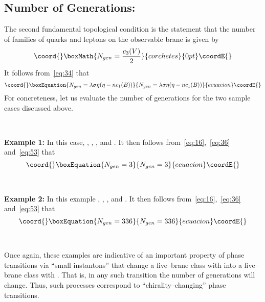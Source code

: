 \documentclass[a4paper,12pt]{article}
\numberwithin{equation}{section}
\def\cE{{\mathcal E}}
\def\cS{{\mathcal S}}
\theoremstyle{plain}
\begin{document}
\subsection*{Number of Generations:}

The second fundamental topological condition is the statement that the number
of families of quarks and leptons on the observable brane is given by
\[\coord{}\boxMath{
N_{gen}=\frac{c_{3}(V)}{2}
}{corchetes}{0pt}\coordE{}\]
It follows from~\eqref{eq:34} that
\begin{equation}\coord{}\boxEquation{
N_{gen}=\lambda \sigma \eta( \eta-nc_{1}(B))
\label{eq:53}
}{
N_{gen}=\lambda \sigma \eta( \eta-nc_{1}(B))
}{ecuacion}\coordE{}\end{equation}
For concreteness, let us evaluate the number of generations for the two 
sample cases discussed above.


\smallskip

\

\noindent
{\bf Example 1:} \quad 
In this case, \coordHE{}, \coordHE{}, \coordHE{}, \myHighlight{$\eta=12\cS+15\cE$}\coordHE{} and
\coordHE{}. It then follows
from~\eqref{eq:16},~\eqref{eq:36} and~\eqref{eq:53} that 
\begin{equation}\coord{}\boxEquation{
N_{gen}=3
\label{eq:54}
}{
N_{gen}=3
}{ecuacion}\coordE{}\end{equation}


\smallskip

\

\noindent
{\bf Example 2:} \quad In this example 
\coordHE{}, \coordHE{}, \coordHE{}, \myHighlight{$\eta=24\cS+36\cE$}\coordHE{} and
\coordHE{}. It then follows
from~\eqref{eq:16},~\eqref{eq:36} and~\eqref{eq:53} that 
\begin{equation}\coord{}\boxEquation{
N_{gen}=336
\label{eq:55}
}{
N_{gen}=336
}{ecuacion}\coordE{}\end{equation}


\smallskip

\

Once again, these examples are indicative of an important property of phase
transitions via ``small instantons'' that change a five--brane class with
\coordHE{} into a five--brane class with \coordHE{}. That is, in any such
transition the number of generations will change. Thus, such processes
correspond to ``chirality--changing'' phase transitions.
\end{document}
